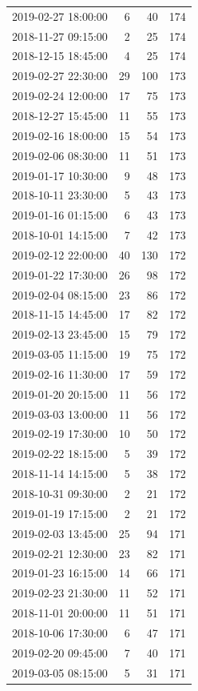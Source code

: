 \begin{tabular}{lrrr}
2019-02-27 18:00:00 & 6 & 40 & 174 \\
2018-11-27 09:15:00 & 2 & 25 & 174 \\
2018-12-15 18:45:00 & 4 & 25 & 174 \\
2019-02-27 22:30:00 & 29 & 100 & 173 \\
2019-02-24 12:00:00 & 17 & 75 & 173 \\
2018-12-27 15:45:00 & 11 & 55 & 173 \\
2019-02-16 18:00:00 & 15 & 54 & 173 \\
2019-02-06 08:30:00 & 11 & 51 & 173 \\
2019-01-17 10:30:00 & 9 & 48 & 173 \\
2018-10-11 23:30:00 & 5 & 43 & 173 \\
2019-01-16 01:15:00 & 6 & 43 & 173 \\
2018-10-01 14:15:00 & 7 & 42 & 173 \\
2019-02-12 22:00:00 & 40 & 130 & 172 \\
2019-01-22 17:30:00 & 26 & 98 & 172 \\
2019-02-04 08:15:00 & 23 & 86 & 172 \\
2018-11-15 14:45:00 & 17 & 82 & 172 \\
2019-02-13 23:45:00 & 15 & 79 & 172 \\
2019-03-05 11:15:00 & 19 & 75 & 172 \\
2019-02-16 11:30:00 & 17 & 59 & 172 \\
2019-01-20 20:15:00 & 11 & 56 & 172 \\
2019-03-03 13:00:00 & 11 & 56 & 172 \\
2019-02-19 17:30:00 & 10 & 50 & 172 \\
2019-02-22 18:15:00 & 5 & 39 & 172 \\
2018-11-14 14:15:00 & 5 & 38 & 172 \\
2018-10-31 09:30:00 & 2 & 21 & 172 \\
2019-01-19 17:15:00 & 2 & 21 & 172 \\
2019-02-03 13:45:00 & 25 & 94 & 171 \\
2019-02-21 12:30:00 & 23 & 82 & 171 \\
2019-01-23 16:15:00 & 14 & 66 & 171 \\
2019-02-23 21:30:00 & 11 & 52 & 171 \\
2018-11-01 20:00:00 & 11 & 51 & 171 \\
2018-10-06 17:30:00 & 6 & 47 & 171 \\
2019-02-20 09:45:00 & 7 & 40 & 171 \\
2019-03-05 08:15:00 & 5 & 31 & 171 \\

\end{tabular}

